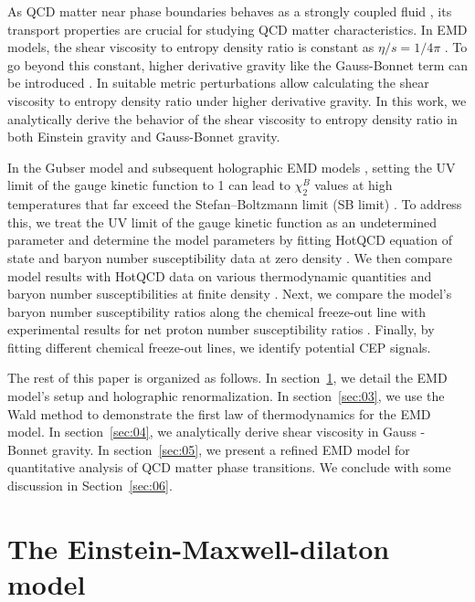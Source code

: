 \documentclass[a4paper,12pt]{article}
\numberwithin{equation}{section}
\begin{document}
As QCD matter near phase boundaries behaves as a strongly coupled fluid \cite{Shuryak:2014zxa}, its transport properties are crucial for studying QCD matter characteristics. In EMD models, the shear viscosity to entropy density ratio is constant as $\eta/s=1/4\pi$ \cite{DeWolfe:2011ts}. To go beyond this constant, higher derivative gravity like the Gauss-Bonnet term can be introduced \cite{Ge:2009eh,Charmousis:2012dw}. In \cite{Fan:2018qnt} suitable metric perturbations allow calculating the shear viscosity to entropy density ratio under higher derivative gravity. In this work, we analytically derive the behavior of the shear viscosity to entropy density ratio in both Einstein gravity and Gauss-Bonnet gravity.

In the Gubser model and subsequent holographic EMD models \cite{DeWolfe:2010he, DeWolfe:2011ts, Cai:2022omk, Rougemont:2023gfz, Li:2024lrh}, setting the UV limit of the gauge kinetic function to 1 can lead to $\chi_2^B$ values at high temperatures that far exceed the Stefan–Boltzmann limit (SB limit) \cite{Fu:2020xnh, Jokela:2024xgz}. To address this, we treat the UV limit of the gauge kinetic function as an undetermined parameter \cite{Jokela:2024xgz} and determine the model parameters by fitting HotQCD equation of state and baryon number susceptibility data at zero density \cite{HotQCD:2012fhj, HotQCD:2014kol, Bazavov:2017dus}. We then compare model results with HotQCD data on various thermodynamic quantities and baryon number susceptibilities at finite density \cite{Bazavov:2017dus,Bollweg:2022rps}. Next, we compare the model’s baryon number susceptibility ratios along the chemical freeze-out line with experimental results for net proton number susceptibility ratios \cite{Xu:2016mqs,STAR:2021fge,STAR:2025zdq}. Finally, by fitting different chemical freeze-out lines, we identify potential CEP signals.

The rest of this paper is organized as follows. In section~\ref{sec:02}, we detail the EMD model's setup and holographic renormalization. In section~\ref{sec:03}, we use the Wald method to demonstrate the first law of thermodynamics for the EMD model. In section~\ref{sec:04}, we analytically derive shear viscosity in Gauss - Bonnet gravity. In section~\ref{sec:05}, we present a refined EMD model for quantitative analysis of QCD matter phase transitions. We conclude with some discussion in Section~\ref{sec:06}.

\section{The Einstein-Maxwell-dilaton model}\label{sec:02}
\end{document}
